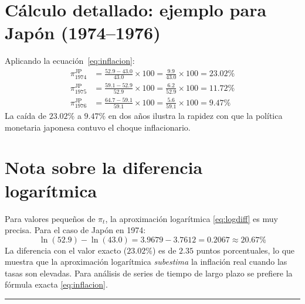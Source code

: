 \documentclass[12pt, letterpaper]{article}
\theoremstyle{remark}
\begin{document}
\appendix

\section{C\'alculo detallado: ejemplo para Jap\'on (1974--1976)}

Aplicando la ecuaci\'on~\eqref{eq:inflacion}:
\begin{align}
  \pi_{1974}^{\text{JP}}
    &= \frac{52.9 - 43.0}{43.0}\times 100
     = \frac{9.9}{43.0}\times 100
     = 23.02\% \\[4pt]
  \pi_{1975}^{\text{JP}}
    &= \frac{59.1 - 52.9}{52.9}\times 100
     = \frac{6.2}{52.9}\times 100
     = 11.72\% \\[4pt]
  \pi_{1976}^{\text{JP}}
    &= \frac{64.7 - 59.1}{59.1}\times 100
     = \frac{5.6}{59.1}\times 100
     = 9.47\%
\end{align}
La ca\'ida de $23.02\%$ a $9.47\%$ en dos a\~nos ilustra la rapidez con
que la pol\'itica monetaria japonesa contuvo el choque inflacionario.

\section{Nota sobre la diferencia logar\'itmica}

Para valores peque\~nos de $\pi_t$, la aproximaci\'on logar\'itmica
\eqref{eq:logdiff} es muy precisa. Para el caso de Jap\'on en 1974:
\begin{equation}
  \ln(52.9) - \ln(43.0) = 3.9679 - 3.7612 = 0.2067 \approx 20.67\%
\end{equation}
La diferencia con el valor exacto ($23.02\%$) es de $2.35$ puntos
porcentuales, lo que muestra que la aproximaci\'on logar\'itmica
\emph{subestima} la inflaci\'on real cuando las tasas son elevadas.
Para an\'alisis de series de tiempo de largo plazo se prefiere la
f\'ormula exacta \eqref{eq:inflacion}.

\vspace{14pt}
\noindent\rule{\linewidth}{0.4pt}

\end{document}
